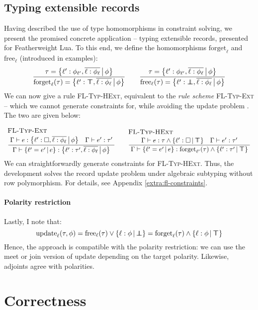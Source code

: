 \subsection{Typing extensible records}
Having described the use of type homomorphisms in constraint solving, we present the promised concrete application -- typing extensible records, presented for Featherweight Lua. To this end, we define the homomorphisms $\mathrm{forget}_\ell$ and $\mathrm{free}_\ell$ (introduced in examples):
$$ 
\dfrac
  {\tau = \flext{\ell' : \phi_{\ell'},  \overline{\ell : \phi_\ell}}{\phi}}
  {\mathrm{forget}_\ell(\tau) = \flext{\ell' : \flftop,  \overline{\ell : \phi_\ell}}{\phi}}
\qquad 
\dfrac
  {\tau = \flext{\ell' : \phi_{\ell'},  \overline{\ell : \phi_\ell}}{\phi}}
  {\mathrm{free}_\ell(\tau) = \flext{\ell' : \flfbot,  \overline{\ell : \phi_\ell}}{\phi}}
$$
We can now give a rule \textsc{FL-Typ-HExt}, equivalent to the \emph{rule scheme} \textsc{FL-Typ-Ext} -- which we cannot generate constraints for, while avoiding the update problem \cite{operations-on-records}. The two are given below:
$$
\irule{FL-Typ-Ext}
    {\Gamma \vdash e : \flext{\ell' : \flabsent, \overline{\ell : \phi_\ell}}{\phi} \quad \Gamma \vdash e' : \tau'}
    {\Gamma \vdash \flext{\ell' = e'}{e} : \flext{\ell' : \tau', \overline{\ell : \phi_\ell}}{\phi}}
\quad 
\irule{FL-Typ-HExt}{\Gamma \vdash e : \tau \meet \flext{\ell' : \flabsent}{\flftop} \quad \Gamma \vdash e' : \tau'}{\Gamma \vdash \flext{\ell' = e'}{e} : \mathrm{forget}_{\ell'}(\tau) \meet \flext{\ell' : \tau'}{\flftop}}
$$
We can straightforwardly generate constraints for 
\textsc{FL-Typ-HExt}.
Thus, the development solves the record update problem under algebraic subtyping without row polymorphism. For details, see Appendix \ref{extra:fl-constraints}.

\paragraph{Polarity restriction} Lastly, I note that:
$$ \mathrm{update}_\ell(\tau, \phi) = \mathrm{free}_\ell(\tau) \join \flext{ \ell : \phi }{\flfbot} = \mathrm{forget}_\ell(\tau) \meet \flext{ \ell : \phi }{\flftop}  $$ 
Hence, the approach is compatible with the polarity restriction: we can use the meet or join version of $\mathrm{update}$ depending on the target polarity. Likewise, adjoints agree with polarities.

\needspace{6em}
\section{Correctness}
\label{sec:correctness}

